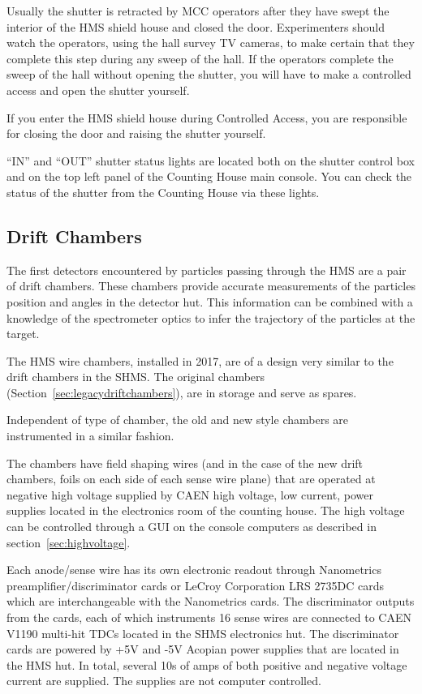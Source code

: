 {Usually the shutter is retracted by MCC operators after they have
swept the interior of the HMS shield house and closed the
door. Experimenters should watch the operators, using the hall survey
TV cameras, to make certain that they complete this step during any
sweep of the hall. If the operators complete the sweep of the hall
without opening the shutter, you will have to make a controlled access
and open the shutter yourself.

If you enter the HMS shield house during Controlled Access, you are
responsible for closing the door and raising the shutter yourself.

``IN'' and ``OUT'' shutter status lights are located both on the
shutter control box and on the top left panel of the Counting House
main console. You can check the status of the shutter from the
Counting House via these lights.



\subsection{Drift Chambers}
The first detectors encountered by particles passing through the HMS
are a pair of drift chambers.  These chambers
provide accurate measurements of the particles
position and angles in the detector hut. This information can be combined
with a knowledge of the spectrometer optics to infer the trajectory of the
particles at the target.

The HMS wire chambers, installed in 2017, are of a design
very similar to the drift chambers in the SHMS.  The original chambers
(Section~\ref{sec:legacydriftchambers}), are in storage and serve as
spares.

Independent of type of chamber, the old and new style chambers are
instrumented in a similar fashion.

The chambers have field shaping wires (and in the case of the new
drift chambers, foils on each side of each sense wire plane) that are
operated at negative high voltage supplied by CAEN high voltage, low
current, power supplies located in the electronics room of the
counting house.  The high voltage can be controlled through a GUI on
the console computers as described in section~\ref{sec:highvoltage}.

Each anode/sense wire has its own electronic readout through
Nanometrics preamplifier/discriminator cards or LeCroy Corporation LRS
2735DC cards which are interchangeable with the Nanometrics cards.
The discriminator outputs from the cards, each of which instruments 16
sense wires are connected to CAEN V1190 multi-hit TDCs located in the
SHMS electronics hut.
The discriminator cards are powered by +5V and -5V Acopian power
supplies that are
located in the HMS hut.  In total, several 10s of amps of both positive
and negative voltage current are supplied.  The supplies are not
computer controlled.

}
